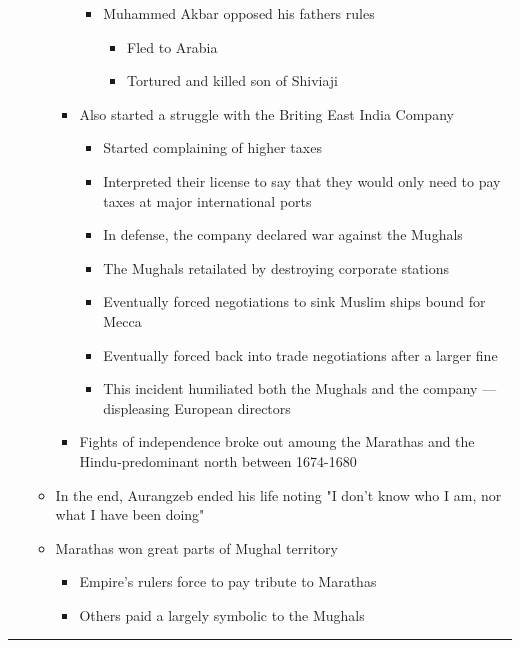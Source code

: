 \documentclass[letterpaper]{article}
\begin{document}
\begin{itemize}
\begin{itemize}
\begin{itemize}
\begin{itemize}
\item Muhammed Akbar opposed his fathers rules

\begin{itemize}
\item Fled to Arabia
\item Tortured and killed son of Shiviaji
\end{itemize}
\end{itemize}

\item Also started a struggle with the Briting East India Company

\begin{itemize}
\item Started complaining of higher taxes
\item Interpreted their license to say that they would only need to
pay taxes at major international ports
\item In defense, the company declared war against the Mughals
\item The Mughals retailated by destroying corporate stations
\item Eventually forced negotiations to sink Muslim ships bound for
Mecca
\item Eventually forced back into trade negotiations after a larger
fine
\item This incident humiliated both the Mughals and the company ---
displeasing European directors
\end{itemize}

\item Fights of independence broke out amoung the Marathas and the
Hindu-predominant north between 1674-1680
\end{itemize}

\item In the end, Aurangzeb ended his life noting "I don't know who I am,
nor what I have been doing"
\item Marathas won great parts of Mughal territory

\begin{itemize}
\item Empire's rulers force to pay tribute to Marathas
\item Others paid a largely symbolic to the Mughals
\end{itemize}
\end{itemize}
\end{itemize}

\noindent\rule{\textwidth}{0.5pt}
\end{document}
